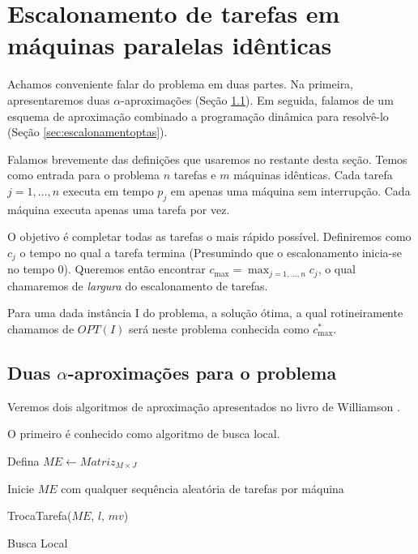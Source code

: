\section{Escalonamento de tarefas em máquinas paralelas idênticas}
\label{sec:escalonamento}

Achamos conveniente falar do problema em duas partes. Na primeira, apresentaremos duas $\alpha$-aproximações (Seção \ref{sec:escalonamentocte}). Em seguida, falamos de um esquema de aproximação combinado a programação dinâmica para resolvê-lo (Seção \ref{sec:escalonamentoptas}).

Falamos brevemente das definições que usaremos no restante desta seção. Temos como entrada para o problema $n$ tarefas e $m$ máquinas idênticas. Cada tarefa $j = 1, \ldots, n$ executa em tempo $p_j$ em apenas uma máquina sem interrupção. Cada máquina executa apenas uma tarefa por vez. 

O objetivo é completar todas as tarefas o mais rápido possível. Definiremos como $c_j$ o tempo no qual a tarefa termina (Presumindo que o escalonamento inicia-se no tempo 0). Queremos então encontrar $c_{\max} = \max_{j = 1, \ldots, n} c_j$, o qual chamaremos de \textit{largura} do escalonamento de tarefas.

Para uma dada instância I do problema, a solução ótima, a qual rotineiramente chamamos de $OPT(I)$ será neste problema conhecida como $c_{\max}^*$.

\subsection{Duas $\alpha$-aproximações para o problema}
\label{sec:escalonamentocte}

Veremos dois algoritmos de aproximação apresentados no livro de Williamson \cite{Williamson}.

O primeiro é conhecido como algoritmo de busca local.

\begin{algorithm}[H]
\SetAlgoLined
{}

Defina $ME \leftarrow Matriz_{M \times J}$

Inicie $ME$ com qualquer sequência aleatória de tarefas por máquina

 { TrocaTarefa($ME$, $l$, $mv$)  }

\caption{Busca Local}
\label{alg:buscalocalescalonamento}
\end{algorithm}

